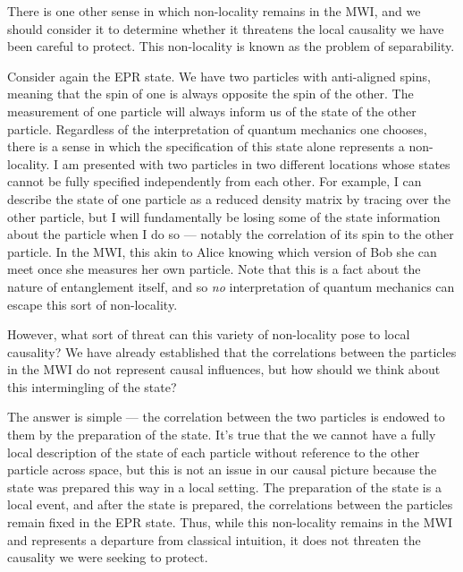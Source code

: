 There is one other sense in which non-locality remains in the MWI, and we should
consider it to determine whether it threatens the local causality we have been
careful to protect. This non-locality is known as the problem of separability.

Consider again the EPR state. We have two particles with anti-aligned spins,
meaning that the spin of one is always opposite the spin of the other. The
measurement of one particle will always inform us of the state of the other
particle. Regardless of the interpretation of quantum mechanics one chooses, 
there is a sense in which the specification of this state alone represents a 
non-locality. I am presented with two particles in two different locations whose
states cannot be fully specified independently from each other. For example, I
can describe the state of one particle as a reduced density matrix by tracing
over the other particle, but I will fundamentally be losing some of the state
information about the particle when I do so — notably the correlation of its 
spin to the other particle. In the MWI, this akin to Alice knowing which version
of Bob she can meet once she measures her own particle. Note that this is a fact
about the nature of entanglement itself, and so \emph{no} interpretation of
quantum mechanics can escape this sort of non-locality.

However, what sort of threat can this variety of non-locality pose to local 
causality? We have already established that the correlations between the 
particles in the MWI do not represent causal influences, but how should we think
about this intermingling of the state?

The answer is simple — the correlation between the two particles is endowed to
them by the preparation of the state. It's true that the we cannot have a fully
local description of the state of each particle without reference to the other
particle across space, but this is not an issue in our causal picture because
the state was prepared this way in a local setting. The preparation of the state
is a local event, and after the state is prepared, the correlations between the
particles remain fixed in the EPR state. Thus, while this non-locality remains
in the MWI and represents a departure from classical intuition, it does not 
threaten the causality we were seeking to protect.
